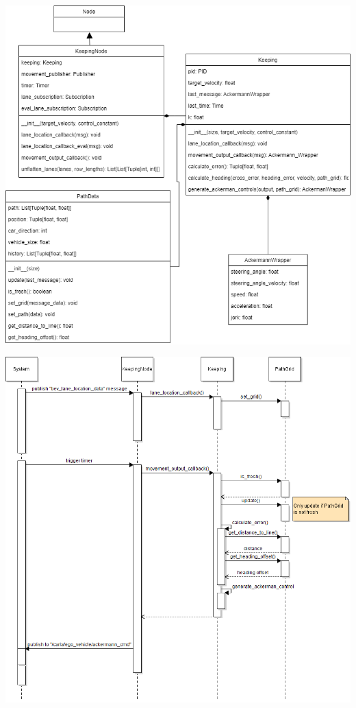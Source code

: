 \documentclass[titlepage]{article}
\begin{document}
\begin{center}
	\includegraphics[width=6in]{KnC_diagrams.png}\\
	 \label{fig:control_class}
\end{center}

\begin{center}
	\includegraphics[width=6in]{KnC_sequence.png}\\
	 \label{fig:control_sequence}
\end{center}
\end{document}
